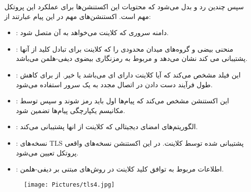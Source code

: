 \documentclass{report}
\begin{document}
سپس چندین  رد و بدل می‌شود که محتویات این اکستنشن‌ها برای عملکرد این پروتکل مهم است. اکستنشن‌های مهم در این پیام عبارتند از:
\begin{itemize}
	
	\item {}:
	دامنه سروری که کلاینت می‌خواهد به آن متصل شود.
	
	\item {}:
	منحنی بیضی و گروه‌های میدان محدودی را که کلاینت برای تبادل کلید از آنها پشتیبانی می کند نشان می‌دهد و مربوط به رمزنگاری بیضوی دیفی-هلمن می‌باشد.
	
	\item {}:
	این فیلد مشخص می‌کند که آیا کلاینت دارای  ای می‌باشد یا خیر. از  برای کاهش طول فرآیند دست دادن در اتصال مجدد به یک سرور استفاده می‌شود.

	\item {}:
	این اکستنشن مشخص می‌کند که پیام‌ها اول باید رمز شوند و سپس توسط مکانیسم  یکپارچگی پیام‌ها تضمین شود.

	\item {}:
الگوریتم‌های امضای دیجیتالی که کلاینت از انها پشتیبانی می‌کند.
	
	\item {}:
	نسخه‌های TLS پشتیبانی شده توسط کلاینت. در این اکستنشن نسخه‌های واقعی پروتکل تعیین می‌شود.
	
	\item {}:
اطلاعات مربوط به توافق کلید کلاینت در روش‌های مبتنی بر دیفی-هلمن.

\end{itemize}

\begin{figure}[H]
	\centering
	\texttt{[image: Pictures/tls4.jpg]}
	\label{tls4}
\end{figure}
\end{document}
